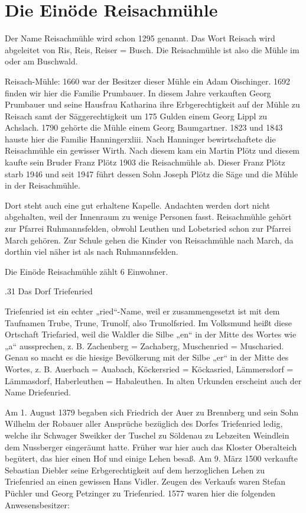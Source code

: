 \documentclass{book}
\begin{document}
\section{Die Einöde Reisachmühle}

Der Name Reisachmühle wird schon 1295 genannt. Das Wort Reisach wird abgeleitet
von Ris, Reis, Reiser = Busch. Die Reisachmühle ist also die Mühle im oder am
Buschwald.

Reisach-Mühle: 1660 war der Besitzer dieser Mühle ein Adam Oischinger. 1692
finden wir hier die Familie Prumbauer. In diesem Jahre verkauften Georg
Prumbauer und seine Hausfrau Katharina ihre Erbgerechtigkeit auf der Mühle zu
Reisach samt der Säggerechtigkeit um 175 Gulden einem Georg Lippl zu Achslach.
1790 gehörte die Mühle einem Georg Baumgartner. 1823 und 1843 hauste hier die
Familie Hanningerxliii. Nach Hanninger bewirtschaftete die Reisachmühle ein
gewisser Wirth. Nach diesem kam ein Martin Plötz und diesem kaufte sein Bruder
Franz Plötz 1903 die Reisachmühle ab. Dieser Franz Plötz starb 1946 und seit
1947 führt dessen Sohn Joseph Plötz die Säge und die Mühle in der Reisachmühle.

Dort steht auch eine gut erhaltene Kapelle. Andachten werden dort nicht
abgehalten, weil der Innenraum zu wenige Personen fasst. Reisachmühle gehört zur
Pfarrei Ruhmannsfelden, obwohl Leuthen und Lobetsried schon zur Pfarrei March
gehören. Zur Schule gehen die Kinder von Reisachmühle nach March, da dorthin
viel näher ist als nach Ruhmannsfelden.

Die Einöde Reisachmühle zählt 6 Einwohner.

.31 Das Dorf Triefenried

Triefenried ist ein echter „ried“-Name, weil er zusammengesetzt ist mit dem
Taufnamen Trube, Trune, Trunolf, also Trunolfsried. Im Volksmund heißt diese
Ortschaft Triefaried, weil die Waldler die Silbe „en“ in der Mitte des Wortes
wie „a“ aussprechen, z. B. Zachenberg = Zachaberg, Muschenried = Muscharied.
Genau so macht es die hiesige Bevölkerung mit der Silbe „er“ in der Mitte des
Wortes, z. B. Auerbach = Auabach, Köckersried = Köckasried, Lämmersdorf =
Lämmasdorf, Haberleuthen = Habaleuthen. In alten Urkunden erscheint auch der
Name Driefenried.

Am 1. August 1379 begaben sich Friedrich der Auer zu Brennberg und sein Sohn
Wilhelm der Robauer aller Ansprüche bezüglich des Dorfes Triefenried ledig,
welche ihr Schwager Sweikker der Tuschel zu Söldenau zu Lebzeiten Weindlein dem
Nussberger eingeräumt hatte. Früher war hier auch das Kloster Oberalteich
begütert, das hier einen Hof und einige Lehen besaß. Am 9. März 1500 verkaufte
Sebastian Diebler seine Erbgerechtigkeit auf dem herzoglichen Lehen zu
Triefenried an einen gewissen Hans Vidler. Zeugen des Verkaufs waren Stefan
Püchler und Georg Petzinger zu Triefenried. 1577 waren hier die folgenden
Anwesensbesitzer:
\end{document}
